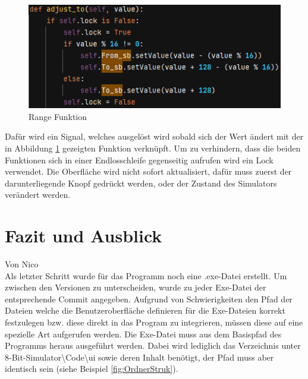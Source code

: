 \documentclass[12pt]{article}
\newcommand{\imgSpaceBefore}{\vspace{10pt}}
\begin{document}
\begin{figure}[H]
\centering
\includegraphics[width=12cm]{bilder/Range_to}
\caption{Range Funktion}
\label{fig:Range}
\end{figure}

\noindent
Dafür wird ein Signal, welches ausgelöst wird sobald sich der Wert ändert mit der in Abbildung \ref{fig:Range} gezeigten Funktion verknüpft. Um zu verhindern, dass die beiden Funktionen sich in einer Endlosschleife gegenseitig aufrufen wird ein Lock verwendet. Die Oberfläche wird nicht sofort aktualisiert, dafür muss zuerst der darunterliegende Knopf gedrückt werden, oder der Zustand des Simulators verändert werden.

\newpage

\section{Fazit und Ausblick}
Von Nico \\

\noindent
Als letzter Schritt wurde für das Programm noch eine .exe-Datei erstellt. Um zwischen den Versionen zu unterscheiden, wurde zu jeder Exe-Datei der entsprechende Commit angegeben. Aufgrund von Schwierigkeiten den Pfad der Dateien welche die Benutzeroberfläche definieren für die Exe-Dateien korrekt festzulegen bzw. diese direkt in das Program zu integrieren, müssen diese auf eine spezielle Art aufgerufen werden. Die Exe-Datei muss aus dem Basispfad des Programms heraus ausgeführt werden. Dabei wird lediglich das Verzeichnis unter 8-Bit-Simulator\textbackslash Code\textbackslash ui sowie deren Inhalt benötigt, der Pfad muss aber identisch sein (siehe Beispiel \ref{fig:OrdnerStruk}).\imgSpaceBefore
\end{document}
